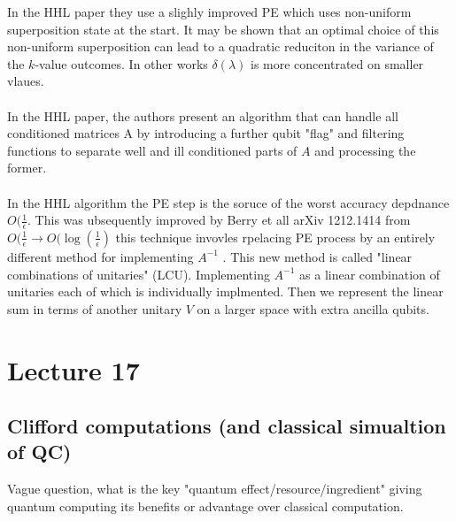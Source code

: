 \documentclass{article}
\begin{document}
                        In the HHL paper they use a slighly improved PE which uses non-uniform superposition state at the start. It may be shown that an optimal choice of this non-uniform superposition can lead to a quadratic reduciton in the variance of the $k$-value outcomes. In other works $\delta(\lambda)$ is more concentrated on smaller vlaues.\\\\
                        In the HHL paper, the authors present an algorithm that can handle all conditioned matrices A by introducing a further qubit "flag" and filtering functions to separate well and ill conditioned parts of $A$ and processing the former. \\\\
                        In the HHL algorithm the PE step is the soruce of the worst accuracy depdnance $O(\frac{1}{\epsilon}$. This was ubsequently improved  by Berry et all arXiv 1212.1414 from $O(\frac{1}{\epsilon} \rightarrow O(\log( \frac{1}{\epsilon})$ this technique invovles rpelacing PE process by an entirely different method for implementing $A^{-1}$ . This new method is called "linear combinations of unitaries" (LCU). Implementing $A^{-1}$ as a linear combination of unitaries each of which is individually implmented. Then we represent the linear sum in terms of another unitary $V$ on a larger space with extra ancilla qubits.
                        \section{Lecture 17}
                        \subsection{Clifford computations (and classical simualtion of QC)}
                        Vague question, what is the key "quantum effect/resource/ingredient" giving quantum computing its benefits or advantage over classical computation.
\end{document}
